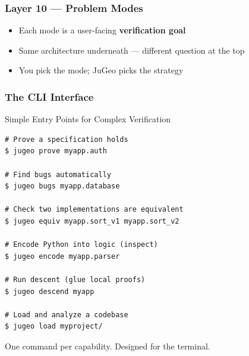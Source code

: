 \begin{frame}
\frametitle{Layer 10 --- Problem Modes}
\begin{center}
\end{center}
\vfill
\begin{itemize}
  \item Each mode is a user-facing \textbf{verification goal}
  \item Same architecture underneath --- different question at the top
  \item You pick the mode; JuGeo picks the strategy
\end{itemize}
\end{frame}

\begin{frame}[fragile]
\frametitle{The CLI Interface}
\begin{block}{Simple Entry Points for Complex Verification}
\begin{lstlisting}
# Prove a specification holds
$ jugeo prove myapp.auth

# Find bugs automatically
$ jugeo bugs myapp.database

# Check two implementations are equivalent
$ jugeo equiv myapp.sort_v1 myapp.sort_v2

# Encode Python into logic (inspect)
$ jugeo encode myapp.parser

# Run descent (glue local proofs)
$ jugeo descend myapp

# Load and analyze a codebase
$ jugeo load myproject/
\end{lstlisting}
\end{block}
\vfill
\begin{center}
  {\small One command per capability. Designed for the terminal.}
\end{center}
\end{frame}

